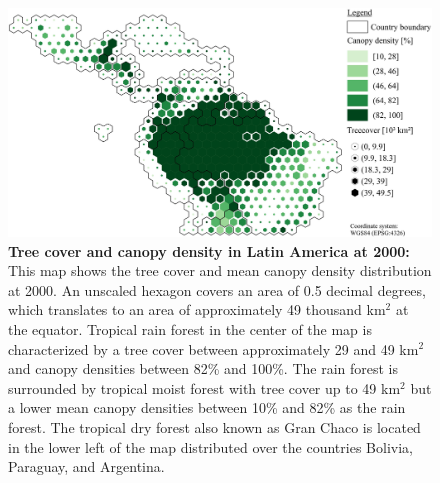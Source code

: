 			\begin{figure}[ht]
				\centering
				\includegraphics[scale=.85]{img/americas_treecover_frameless}
				\caption[Tree cover and canopy density in Latin America at 2000]{\textbf{Tree cover and canopy density in Latin America at 2000:} This map shows the tree cover and mean canopy density distribution at 2000. An unscaled hexagon covers an area of 0.5 decimal degrees, which translates to an area of approximately 49 thousand km$^2$ at the equator. Tropical rain forest in the center of the map is characterized by a tree cover between approximately 29 and 49 km$^2$ and canopy densities between 82\% and 100\%. The rain forest is surrounded by tropical moist forest with tree cover up to 49 km$^2$ but a lower mean canopy densities between 10\% and 82\% as the rain forest. The tropical dry forest also known as Gran Chaco is located in the lower left of the map distributed over the countries Bolivia, Paraguay, and Argentina.}
				\label{fig:americas_tree_cover}
			\end{figure}


